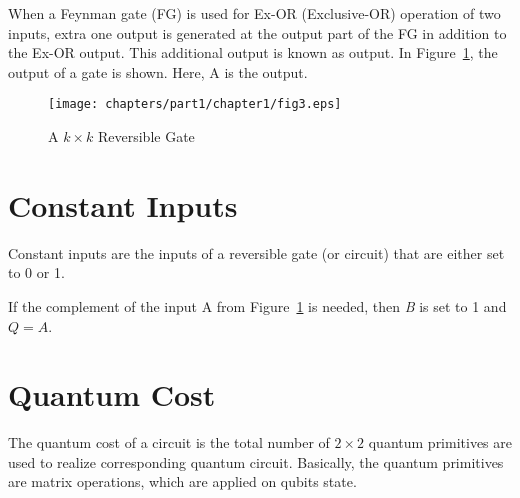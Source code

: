 
\begin{example}\textnormal{
When a Feynman gate (FG) is used for Ex-OR (Exclusive-OR) operation of two inputs, extra one output is generated at the output part of the FG in addition to the Ex-OR output. This additional output is known as  output. In Figure~\ref{fig:p1_c1_fig3}, the  output of a gate is shown. Here, A is the  output.}
\end{example}

\begin{figure}[H]
\centering
\texttt{[image: chapters/part1/chapter1/fig3.eps]}
\caption{A $k \times k$ Reversible Gate}
\label{fig:p1_c1_fig3}
\end{figure}

\section{Constant Inputs}
Constant inputs are the inputs of a reversible gate (or circuit) that are either set to 0 or 1.

\begin{example}\textnormal{
If the complement of the input A from Figure~\ref{fig:p1_c1_fig3} is needed, then \textit{B} is set to 1 and $Q = A$.}
\end{example}

\section{Quantum Cost}

The quantum cost of a circuit is the total number of $2 \times 2$ quantum primitives are used to realize corresponding quantum circuit. Basically, the quantum primitives are matrix operations, which are applied on qubits state.%



